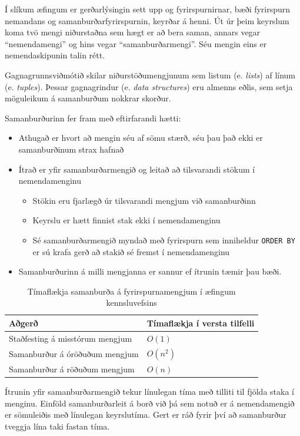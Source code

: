 \documentclass[a4paper,12pt,twoside,BCOR=10mm]{scrbook}
\begin{document}
Í slíkum æfingum er gerðarlýsingin sett upp og fyrirspurnirnar, bæði fyrirspurn nemandans og samanburðarfyrirspurnin, keyrðar á henni. Út úr þeim keyrslum koma tvö mengi niðurstaðna sem hægt er að bera saman, annars vegar ``nemendamengi'' og hins vegar ``samanburðarmengi''. Séu mengin eins er nemendaskipunin talin rétt.

Gagnagrunnsviðmótið skilar niðurstöðumengjunum sem listum (e. \emph{lists}) af línum (e. \emph{tuples}). Þessar gagnagrindur (e. \emph{data structures}) eru almenns eðlis, sem setja möguleikum á samanburðum nokkrar skorður.

Samanburðurinn fer fram með eftirfarandi hætti:
\begin{itemize}
 \item Athugað er hvort að mengin séu af sömu stærð, séu þau það ekki er samanburðinum strax hafnað
 \item Ítrað er yfir samanburðarmengið og leitað að tilsvarandi stökum í nemendamenginu
 \begin{itemize}
  \item Stökin eru fjarlægð úr tilsvarandi mengjum við samanburðinn
  \item Keyrslu er hætt finnist stak ekki í nemendamenginu
  \item Sé samanburðarmengið myndað með fyrirspurn sem inniheldur \texttt{ORDER BY} er sú krafa gerð að stakið sé fremst í nemendamenginu
 \end{itemize}
 \item Samanburðurinn á milli mengjanna er sannur ef ítrunin tæmir þau bæði.
\end{itemize}

\begin{table}
\caption[Tímaflækja samanburða]{Tímaflækja samanburða á fyrirspurnamengjum í æfingum kennsluvefsins}
\label{tab:comparison-complexity}
\begin{center}
\begin{tabular}{ll}
\toprule
Aðgerð&Tímaflækja í versta tilfelli\\
\midrule
Staðfesting á misstórum mengjum& $O(1)$\\
Samanburður á óröðuðum mengjum& $O(n^2)$\\
Samanburður á röðuðum mengjum& $O(n)$\\
\bottomrule
\end{tabular}
\end{center}
\end{table}
Ítrunin yfir samanburðarmengið tekur línulegan tíma með tilliti til fjölda staka í menginu. Einföld samanburðarleit á borð við þá sem notuð er á nemendamengið er sömuleiðis með línulegan keyrslutíma. Gert er ráð fyrir því að samanburður tveggja lína taki fastan tíma.
\end{document}
